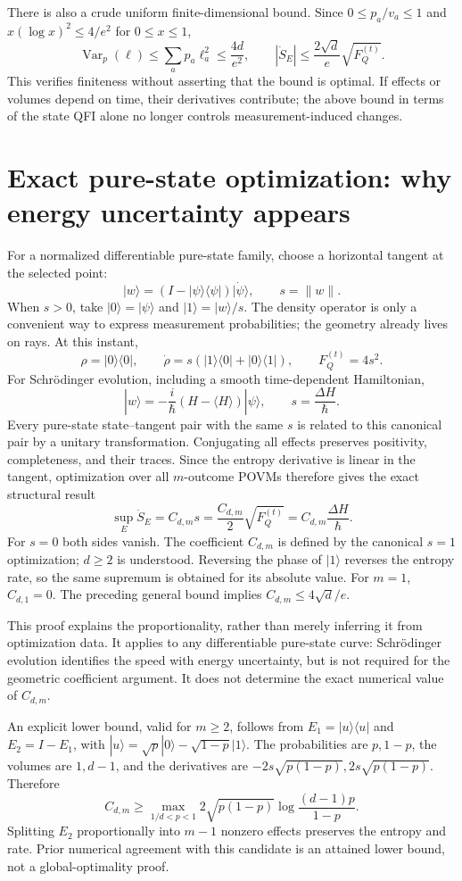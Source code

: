 \documentclass[11pt,a4paper]{article}
\DeclareMathOperator{\Var}{Var}
\begin{document}
There is also a crude uniform finite-dimensional bound. Since $0\le p_a/v_a\le1$ and $x(\log x)^2\le4/e^2$ for $0\le x\le1$,
\[\Var_p(\ell)\le\sum_ap_a\ell_a^2\le\frac{4d}{e^2},\qquad|\dot S_E|\le\frac{2\sqrt d}{e}\sqrt{F_Q^{(t)}}.\]
This verifies finiteness without asserting that the bound is optimal. If effects or volumes depend on time, their derivatives contribute; the above bound in terms of the state QFI alone no longer controls measurement-induced changes.

\section{Exact pure-state optimization: why energy uncertainty appears}
For a normalized differentiable pure-state family, choose a horizontal tangent at the selected point:
\[|w\rangle=(I-|\psi\rangle\langle\psi|)|\dot\psi\rangle,\qquad s=\|w\|.\]
When $s>0$, take $|0\rangle=|\psi\rangle$ and $|1\rangle=|w\rangle/s$. The density operator is only a convenient way to express measurement probabilities; the geometry already lives on rays. At this instant,
\[\rho=|0\rangle\langle0|,\qquad\dot\rho=s(|1\rangle\langle0|+|0\rangle\langle1|),\qquad F_Q^{(t)}=4s^2.\]
For Schr\"odinger evolution, including a smooth time-dependent Hamiltonian,
\[|w\rangle=-\frac{i}{\hbar}(H-\langle H\rangle)|\psi\rangle,\qquad s=\frac{\Delta H}{\hbar}.\]
Every pure-state state--tangent pair with the same $s$ is related to this canonical pair by a unitary transformation. Conjugating all effects preserves positivity, completeness, and their traces. Since the entropy derivative is linear in the tangent, optimization over all $m$-outcome POVMs therefore gives the exact structural result
\[\boxed{\sup_E\dot S_E=C_{d,m}s=\frac{C_{d,m}}2\sqrt{F_Q^{(t)}}=C_{d,m}\frac{\Delta H}{\hbar}.}\]
For $s=0$ both sides vanish. The coefficient $C_{d,m}$ is defined by the canonical $s=1$ optimization; $d\ge2$ is understood. Reversing the phase of $|1\rangle$ reverses the entropy rate, so the same supremum is obtained for its absolute value. For $m=1$, $C_{d,1}=0$. The preceding general bound implies $C_{d,m}\le4\sqrt d/e$.

This proof explains the proportionality, rather than merely inferring it from optimization data. It applies to any differentiable pure-state curve: Schr\"odinger evolution identifies the speed with energy uncertainty, but is not required for the geometric coefficient argument. It does not determine the exact numerical value of $C_{d,m}$.

An explicit lower bound, valid for $m\ge2$, follows from $E_1=|u\rangle\langle u|$ and $E_2=I-E_1$, with $|u\rangle=\sqrt p|0\rangle-\sqrt{1-p}|1\rangle$. The probabilities are $p,1-p$, the volumes are $1,d-1$, and the derivatives are $-2s\sqrt{p(1-p)},2s\sqrt{p(1-p)}$. Therefore
\[C_{d,m}\ge\max_{1/d<p<1}2\sqrt{p(1-p)}\log\frac{(d-1)p}{1-p}.\]
Splitting $E_2$ proportionally into $m-1$ nonzero effects preserves the entropy and rate. Prior numerical agreement with this candidate is an attained lower bound, not a global-optimality proof.
\end{document}
